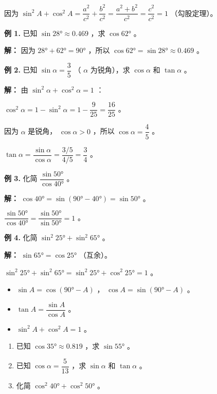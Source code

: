 因为 $\sin^2 A + \cos^2 A = \dfrac{a^2}{c^2} + \dfrac{b^2}{c^2} = \dfrac{a^2 + b^2}{c^2} = \dfrac{c^2}{c^2} = 1$ （勾股定理）。

\begin{workedexamples}


\textbf{例 1.} 已知 $\sin 28° \approx 0.469$ ，求 $\cos 62°$ 。

\textbf{解：}
因为 $28° + 62° = 90°$ ，所以 $\cos 62° = \sin 28° \approx 0.469$ 。

\textbf{例 2.} 已知 $\sin \alpha = \dfrac{3}{5}$ （ $\alpha$ 为锐角），求 $\cos \alpha$ 和 $\tan \alpha$ 。

\textbf{解：}
由 $\sin^2 \alpha + \cos^2 \alpha = 1$ ：

$\cos^2 \alpha = 1 - \sin^2 \alpha = 1 - \dfrac{9}{25} = \dfrac{16}{25}$ 。

因为 $\alpha$ 是锐角， $\cos \alpha > 0$ ，所以 $\cos \alpha = \dfrac{4}{5}$ 。

$\tan \alpha = \dfrac{\sin \alpha}{\cos \alpha} = \dfrac{3/5}{4/5} = \dfrac{3}{4}$ 。

\textbf{例 3.} 化简 $\dfrac{\sin 50°}{\cos 40°}$ 。

\textbf{解：}
$\cos 40° = \sin(90° - 40°) = \sin 50°$ 。

$\dfrac{\sin 50°}{\cos 40°} = \dfrac{\sin 50°}{\sin 50°} = 1$ 。

\textbf{例 4.} 化简 $\sin^2 25° + \sin^2 65°$ 。

\textbf{解：}
$\sin 65° = \cos 25°$ （互余）。

$\sin^2 25° + \sin^2 65° = \sin^2 25° + \cos^2 25° = 1$ 。

\end{workedexamples}

\begin{keytakeaway}


\begin{itemize}
  \item $\sin A = \cos(90° - A)$ ， $\cos A = \sin(90° - A)$ 。
  \item $\tan A = \dfrac{\sin A}{\cos A}$ 。
  \item $\sin^2 A + \cos^2 A = 1$ 。
\end{itemize}


\end{keytakeaway}

\begin{practice}


\begin{enumerate}
  \item 已知 $\cos 35° \approx 0.819$ ，求 $\sin 55°$ 。
  \item 已知 $\cos \alpha = \dfrac{5}{13}$ ，求 $\sin \alpha$ 和 $\tan \alpha$ 。
  \item 化简 $\cos^2 40° + \cos^2 50°$ 。
\end{enumerate}


\end{practice}




